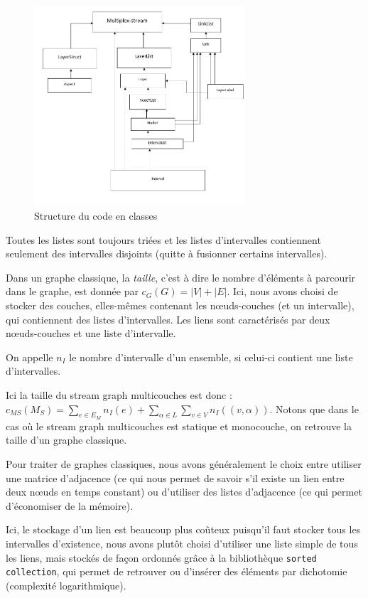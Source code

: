 \documentclass[11pt,a4paper]{article}
\theoremstyle{definition}
\theoremstyle{remark}
\theoremstyle{remark}
\def \stgm {stream graph multicouches}
\begin{document}
	
	
	\begin{figure}[H]
		\centering
		\includegraphics[width=0.7\textwidth]{codeStructure.JPG}
		\caption{Structure du code en classes }
	\end{figure}
	
	Toutes les listes sont toujours triées et les listes d'intervalles contiennent seulement des intervalles disjoints (quitte à fusionner certains intervalles).
	
	Dans un graphe classique, la {\em taille}, c'est à dire le nombre d'éléments à parcourir dans le graphe, est donnée par $c_G(G)=|V|+|E|$. Ici, nous avons choisi de stocker des couches, elles-mêmes contenant les n\oe{}uds-couches (et un intervalle), qui contiennent des listes d'intervalles. Les liens sont caractérisés par deux n\oe{}uds-couches et une liste d'intervalle.
	
	On appelle $n_I$ le nombre d'intervalle d'un ensemble, si celui-ci contient une liste d'intervalles.
	
	Ici la taille du \stgm{} est donc : $c_{MS}(M_S)=\sum_{e \in E_M} n_I(e) + \sum_{\alpha \in L} \sum_{v \in V} n_I((v,\alpha))$. Notons que dans le cas où le \stgm{} est statique et monocouche, on retrouve la taille d'un graphe classique.
	
	Pour traiter de graphes classiques, nous avons généralement le choix entre utiliser une matrice d'adjacence (ce qui nous permet de savoir s'il existe un lien entre deux n\oe{}uds en temps constant) ou d'utiliser des listes d'adjacence (ce qui permet d'économiser de la mémoire).
	
	Ici, le stockage d'un lien est beaucoup plus coûteux puisqu'il faut stocker tous les intervalles d'existence, nous avons plutôt choisi d'utiliser une liste simple de tous les liens, mais stockés de façon ordonnés grâce à la bibliothèque \texttt{sorted collection}, qui permet de retrouver ou d'insérer des éléments par dichotomie (complexité logarithmique).
	
\end{document}
